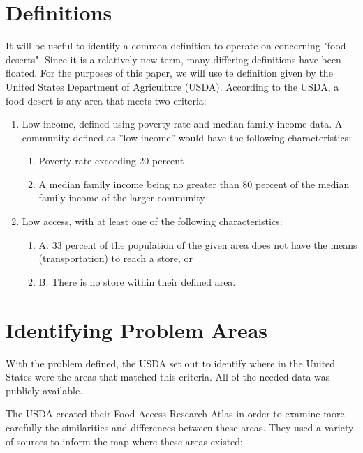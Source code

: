 \documentclass[sigconf]{acmart}
\begin{document}
\section{Definitions}

It will be useful to identify a common definition to operate on concerning "food deserts". Since it is a relatively new term, many differing definitions have been floated. For the purposes of this paper, we will use te definition given by the United States Department of Agriculture (USDA). According to the USDA, a food desert is any area that meets two criteria: 
\begin{enumerate}
    \item Low income, defined using poverty rate and median family income data. A community defined as ''low-income'' would have the following characteristics\cite{ver_ploeg_breneman_farrigan_2009}:
        \begin{enumerate}
        \item Poverty rate exceeding 20 percent
        
        \item A median family income being no greater than 80 percent of the median family income of the larger community
        \end{enumerate}
    \item Low access, with at least one of the following characteristics\cite{usda}:
        \begin{enumerate}
        \item A. 33 percent of the population of the given area does not have the means (transportation) to reach a store, or
        \item B. There is no store within their defined area.
    \end{enumerate}
\end{enumerate}

\section{Identifying Problem Areas}

With the problem defined, the USDA set out to identify where in the United States were the areas that matched this criteria. All of the needed data was publicly available.

The USDA created their Food Access Research Atlas\cite{usdaers-foodaccessresearchatlas} in order to examine more carefully the similarities and differences between these areas. They used a variety of sources to inform the map where these areas existed:
\end{document}
